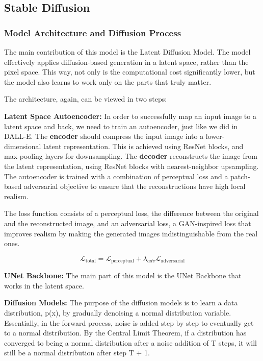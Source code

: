 \documentclass{article}
\begin{document}
\subsection{Stable Diffusion}
\subsubsection{Model Architecture and Diffusion Process}
The main contribution of this model is the Latent Diffusion Model. The model effectively applies diffusion-based generation in a latent space, rather than the pixel space. This way, not only is the computational cost significantly lower, but the model also learns to work only on the parts that truly matter. 

The architecture, again, can be viewed in two steps:

\item \textbf{Latent Space Autoencoder:} In order to successfully map an input image to a latent space and back, we need to train an autoencoder, just like we did in DALL-E. The \textbf{encoder} should compress the input image into a lower-dimensional latent representation. This is achieved using ResNet blocks, and max-pooling layers for downsampling.
The \textbf{decoder} reconstructs the image from the latent representation, using ResNet blocks with nearest-neighbor upsampling. \\

The autoencoder is trained with a combination of perceptual loss and a patch-based adversarial objective to ensure that the reconstructions have high local realism.

The loss function consists of a perceptual loss, the difference between the original and the reconstructed image, and an adversarial loss, a GAN-inspired loss that improves realism by making the generated images indistinguishable from the real ones. 

\[\mathcal{L}_{\text{total}} = \mathcal{L}_{\text{perceptual}} + \lambda_{adv} \mathcal{L}_{\text{adversarial}}\]

\item \textbf{UNet Backbone:} The main part of this model is the UNet Backbone that works in the latent space.

\textbf{Diffusion Models:} The purpose of the diffusion models is to learn a data distribution, p(x), by gradually denoising a normal distribution variable. Essentially, in the forward process, noise is added step by step to eventually get to a normal distribution. By the Central Limit Theorem, if a distribution has converged to being a normal distribution after a noise addition of T steps, it will still be a normal distribution after step T + 1. \\
\end{document}
